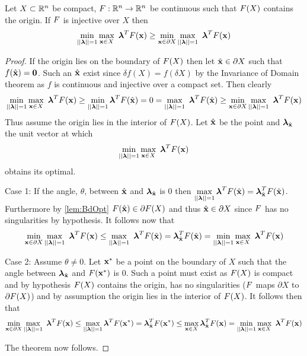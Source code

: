 \begin{thm} 
\label{thm:MainIneq}
Let $X\subset\mathbb{R}^n$ be compact, $F:\mathbb{R}^n\rightarrow\mathbb{R}^n$ be continuous such that $F(X)$ contains the origin. 
If $F$ is injective over $X$ then $$\min\limits_{||\boldsymbol{\lambda}||=1}\max\limits_{\vx\in X}\ \boldsymbol{\lambda}^T\vF(\vx)\geq \min\limits_{\vx\in \partial X}\max\limits_{||\boldsymbol{\lambda}||=1}\ \boldsymbol{\lambda}^T\vF(\vx)$$
\begin{proof}
If the origin lies on the boundary of $F(X)$ then let $\hat{\mathbf{x}}\in \partial X$ such that $f(\hat{\mathbf{x}})=\textbf{0}$. 
Such an $\hat{\mathbf{x}}$ exist since $\delta f(X) = f(\delta X)$ by the Invariance of Domain theorem as $f$ is continuous and injective over a compact set. 
Then  clearly $$\min\limits_{||\boldsymbol{\lambda}||=1}\max\limits_{\vx\in X}\ \boldsymbol{\lambda}^T\vF(\vx)\geq \min\limits_{||\boldsymbol{\lambda}||=1}\boldsymbol{\lambda}^T\vF(\hat{\vx})= 0 = \max\limits_{||\boldsymbol{\lambda}||=1}\ \boldsymbol{\lambda}^T\vF(\hat{\vx}) \geq \min\limits_{\vx\in \partial X}\max\limits_{||\boldsymbol{\lambda}||=1}\ \boldsymbol{\lambda}^T\vF(\vx)$$
Thus assume the origin lies in the interior of $F(X)$.
Let $\hat{\mathbf{x}}$ be the point and $\boldsymbol{\lambda}_{\hat{\mathbf{x}}}$ the unit vector at which $$\min\limits_{||\boldsymbol{\lambda}||=1}\max\limits_{\mathbf{x}\in X}\ \boldsymbol{\lambda}^TF(\mathbf{x})$$
obtains its optimal. 

Case 1: If the angle, $\theta$, between $\hat{\mathbf{x}}$ and $\boldsymbol{\lambda}_{\hat{\mathbf{x}}}$ is 0 then $\max\limits_{||\boldsymbol{\lambda}||=1}\boldsymbol{\lambda}^TF(\hat{\mathbf{x}})=\boldsymbol{\lambda}_{\hat{\mathbf{x}}}^TF(\hat{\mathbf{x}})$. 
Furthermore by \cref{lem:BdOpt} $F(\hat{\mathbf{x}})\in \partial F(X)$ and thus $\hat{\mathbf{x}}\in \partial X$ since $F$ has no singularities by hypothesis. 
It follows now that $$\min\limits_{\vx\in \partial X}\max\limits_{||\boldsymbol{\lambda}||=1}\ \boldsymbol{\lambda}^T\vF(\vx)\leq \max\limits_{||\boldsymbol{\lambda}||=1}\ \boldsymbol{\lambda}^T\vF(\hat{\vx})=\boldsymbol{\lambda}_{\hat{\vx}}^T\vF(\hat{\vx})=\min\limits_{||\boldsymbol{\lambda}||=1}\max\limits_{\vx\in X}\ \boldsymbol{\lambda}^T\vF(\vx)$$

Case 2: Assume $\theta \neq 0$. 
Let $\mathbf{x}^*$ be a point on the boundary of $X$ such that the angle between $\boldsymbol{\lambda}_{\hat{\mathbf{x}}}$ and $F(\mathbf{x}^*)$ is 0. 
Such a point must exist as $F(X)$ is compact and by hypothesis $F(X)$ contains the origin, has no singularities ($F$ maps $\partial X$ to $\partial F(X)$) and by assumption the origin lies in the interior of $F(X)$. 
It follows then that $$\min\limits_{\vx\in \partial X}\max\limits_{||\boldsymbol{\lambda}||=1}\ \boldsymbol{\lambda}^T\vF(\vx)\leq \max\limits_{||\boldsymbol{\lambda}||=1}\boldsymbol{\lambda}^T \vF(\vx^*) =\boldsymbol{\lambda}_{\hat{\vx}}^T\vF(\vx^*)\leq \max\limits_{\vx\in X}\boldsymbol{\lambda}_{\hat{\vx}}^T\vF(\vx)=\min\limits_{||\boldsymbol{\lambda}||=1}\max\limits_{\vx\in X}\ \boldsymbol{\lambda}^T\vF(\vx)$$

The theorem now follows.
\end{proof}
\end{thm}

